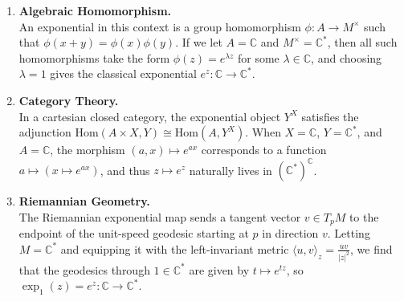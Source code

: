 {\begin{enumerate}
    \\
    \item \textbf{Algebraic Homomorphism.}  \\
    An exponential in this context is a group homomorphism \( \phi \colon A \to M^\times \) such that \( \phi(x + y) = \phi(x)\phi(y) \). If we let \( A = \mathbb{C} \) and \( M^\times = \mathbb{C}^* \), then all such homomorphisms take the form \( \phi(z) = e^{\lambda z} \) for some \( \lambda \in \mathbb{C} \), and choosing \( \lambda = 1 \) gives the classical exponential \( e^z \colon \mathbb{C} \to \mathbb{C}^* \).
    \\
    \item \textbf{Category Theory.}  \\
    In a cartesian closed category, the exponential object \( Y^X \) satisfies the adjunction \( \mathrm{Hom}(A \times X, Y) \cong \mathrm{Hom}(A, Y^X) \). When \( X = \mathbb{C} \), \( Y = \mathbb{C}^* \), and \( A = \mathbb{C} \), the morphism \( (a, x) \mapsto e^{a x} \) corresponds to a function \( a \mapsto (x \mapsto e^{a x}) \), and thus \( z \mapsto e^z \) naturally lives in \( (\mathbb{C}^*)^{\mathbb{C}} \).
    \\
    \item \textbf{Riemannian Geometry.}  \\
    The Riemannian exponential map sends a tangent vector \( v \in T_p M \) to the endpoint of the unit-speed geodesic starting at \( p \) in direction \( v \). Letting \( M = \mathbb{C}^* \) and equipping it with the left-invariant metric \( \langle u, v \rangle_z = \frac{uv}{|z|^2} \), we find that the geodesics through \( 1 \in \mathbb{C}^* \) are given by \( t \mapsto e^{t z} \), so \( \exp_1(z) = e^z \colon \mathbb{C} \to \mathbb{C}^* \).

\end{enumerate}
}
